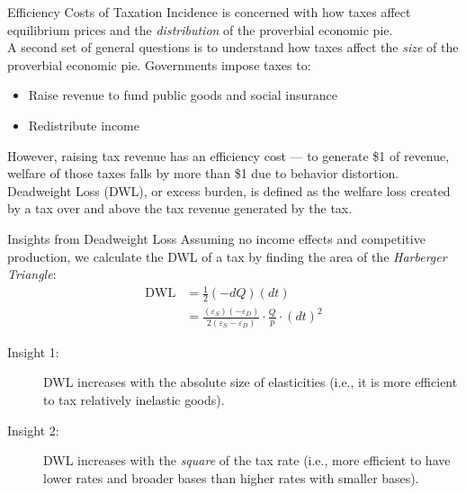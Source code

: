 \documentclass[10pt]{extarticle}
\begin{document}
  \begin{problem}{Efficiency Costs of Taxation}
    Incidence is concerned with how taxes affect equilibrium prices and the \textit{distribution} of the proverbial economic pie.\\

    A second set of general questions is to understand how taxes affect the \textit{size} of the proverbial economic pie. Governments impose taxes to:
    \begin{itemize}
      \item Raise revenue to fund public goods and social insurance
      \item Redistribute income
    \end{itemize}
    However, raising tax revenue has an efficiency cost --- to generate \$1 of revenue, welfare of those taxes falls by more than \$1 due to behavior distortion.\\

    Deadweight Loss (DWL), or excess burden, is defined as the welfare loss created by a tax over and above the tax revenue generated by the tax.
  \end{problem}
  \begin{problem}{Insights from Deadweight Loss}
    Assuming no income effects and competitive production, we calculate the DWL of a tax by finding the area of the \textit{Harberger Triangle}:
    \begin{align*}
      \text{DWL} &= \frac{1}{2}(-dQ)(dt) \tag*{recall that $dQ$ is negative}\\
                 &= \frac{(\varepsilon_S)(-\varepsilon_D)}{2(\varepsilon_S - \varepsilon_D)}\cdot \frac{Q}{p} \cdot (dt)^2
    \end{align*}
    \begin{description}
      \item[Insight 1:] DWL increases with the absolute size of elasticities (i.e., it is more efficient to tax relatively inelastic goods).
      \item[Insight 2:] DWL increases with the \textit{square} of the tax rate (i.e., more efficient to have lower rates and broader bases than higher rates with smaller bases).
    \end{description}
  \end{problem}
\end{document}
